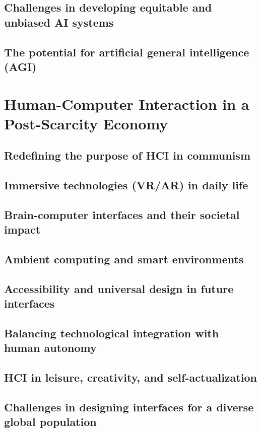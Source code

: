 \subsection{Challenges in developing equitable and unbiased AI systems}
\subsection{The potential for artificial general intelligence (AGI)}

\newpage

\section{Human-Computer Interaction in a Post-Scarcity Economy}
\subsection{Redefining the purpose of HCI in communism}
\subsection{Immersive technologies (VR/AR) in daily life}
\subsection{Brain-computer interfaces and their societal impact}
\subsection{Ambient computing and smart environments}
\subsection{Accessibility and universal design in future interfaces}
\subsection{Balancing technological integration with human autonomy}
\subsection{HCI in leisure, creativity, and self-actualization}
\subsection{Challenges in designing interfaces for a diverse global population}

